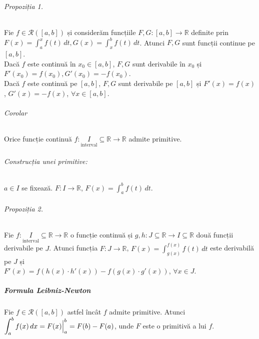 \part{}
\paragraph{Propoziția 1.}
Fie $f \in \mathcal{R}([a,b])$ și considerăm funcțiile $F,G:[a,b] \rightarrow \mathbb{R}$ definite prin
$F(x) = \displaystyle\int_{a}^{x} f(t) \, dt, G(x) = \displaystyle\int_{x}^{b}f(t) \, dt$. Atunci $F,G$
sunt funcții continue pe $[a,b]$. \\[5pt]
Dacă $f$ este continuă în $x_{0} \in [a,b]$, $F, G$ sunt derivabile în $x_{0}$ și $F'(x_{0}) = f(x_{0}), G'(x_{0})=-f(x_{0})$. \\[5pt]
Dacă $f$ este continuă pe $[a,b]$, $F, G$ sunt derivabile pe $[a,b]$ și $F'(x)=f(x)$, $G'(x) = -f(x)$, $\forall x \in [a,b]$.

\paragraph{Corolar}
Orice funcție continuă $f:\underset{\text{interval}}{I} \subseteq \mathbb{R} \rightarrow \mathbb{R}$ admite primitive.

\paragraph{Construcția unei primitive:}
$a \in I$ se fixează. $F:I \rightarrow \mathbb{R}$, $F(x)=\displaystyle\int_{a}^{b} f(t) \, dt$.

\paragraph{Propoziția 2.}
Fie $f:\underset{\text{interval}}{I} \subseteq \mathbb{R} \rightarrow \mathbb{R}$ o funcție continuă și $g,h:J \subseteq \mathbb{R} \rightarrow I \subseteq \mathbb{R}$
două funcții derivabile pe $J$. Atunci funcția $F:J \rightarrow \mathbb{R}$, $F(x) = \displaystyle\int_{g(x)}^{f(x)} f(t) \, dt$ este derivabilă pe $J$
și \\ $F'(x) = f(h(x) \cdot h'(x)) - f(g(x) \cdot g'(x))$, $\forall x \in J$.

\subsubsection{Formula Leibniz-Newton}
Fie $f \in \mathcal{R}([a,b])$ astfel încât $f$ admite primitive. Atunci $\displaystyle\int_{a}^{b} f(x) \, dx = \Bigl.F(x) \Bigr|_{a}^{b} =
F(b) - F(a)$, unde $F$ este o primitivă a lui $f$.

